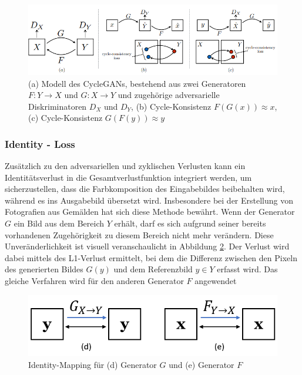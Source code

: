 \begin{figure}[ht]
	\centering
	\includegraphics[width=1\linewidth]{./images/cycle_consistency_loss.png}
	\caption{(a) Modell des CycleGANs, bestehend aus zwei Generatoren $F:Y\rightarrow X$ und $G:X \rightarrow Y$ und zugehörige adversarielle Diskriminatoren $D_X$ und $D_Y$,
     (b) Cycle-Konsistenz $F(G(x))\approx x$,
     (c) Cycle-Konsistenz $G(F(y))\approx y$\cite{Zhu.2017}}
	\label{fig:cycleConsistency}
\end{figure}

\subsubsection{Identity - Loss}
Zusätzlich zu den adversariellen und zyklischen Verlusten kann ein Identitätsverlust in die Gesamtverlustfunktion integriert werden, um sicherzustellen, dass die Farbkomposition des Eingabebildes beibehalten wird, während es ins Ausgabebild übersetzt wird. Insbesondere bei der Erstellung von Fotografien aus Gemälden hat sich diese Methode bewährt.  
Wenn der Generator $G$ ein Bild aus dem Bereich $Y$ erhält, darf es sich aufgrund seiner bereits vorhandenen Zugehörigkeit zu diesem Bereich nicht mehr verändern. Diese Unveränderlichkeit ist visuell veranschaulicht in Abbildung \ref{fig:IdentityMapping}.
Der Verlust wird dabei mittels des L1-Verlust ermittelt, bei dem die Differenz zwischen den Pixeln des generierten Bildes $G(y)$ und dem Referenzbild $y\in Y$ erfasst wird. Das gleiche Verfahren wird für den anderen Generator $F$ angewendet \cite{Zhu.2017}

\begin{figure}[h]
	\centering
	\includegraphics[width=0.7\linewidth]{./images/identity_loss.png}
	\caption{Identity-Mapping für (d) Generator $G$ und (e) Generator $F$}
	\label{fig:IdentityMapping}
\end{figure}


